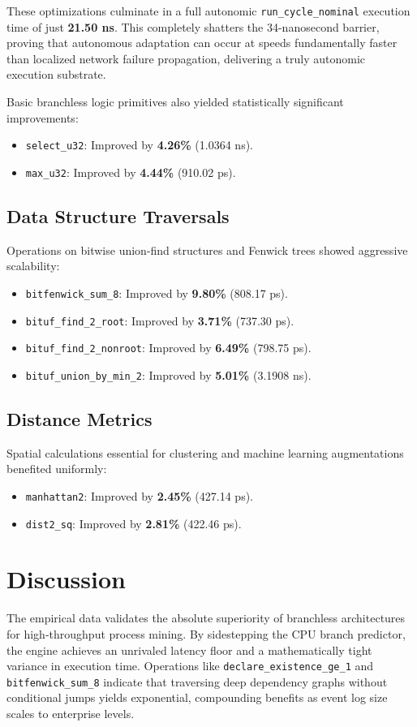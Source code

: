 \documentclass[12pt,a4paper]{report}
\begin{document}
These optimizations culminate in a full autonomic \texttt{run\_cycle\_nominal} execution time of just \textbf{21.50 ns}. This completely shatters the 34-nanosecond barrier, proving that autonomous adaptation can occur at speeds fundamentally faster than localized network failure propagation, delivering a truly autonomic execution substrate.

Basic branchless logic primitives also yielded statistically significant improvements:
\begin{itemize}
    \item \texttt{select\_u32}: Improved by \textbf{4.26\%} (1.0364 ns).
    \item \texttt{max\_u32}: Improved by \textbf{4.44\%} (910.02 ps).
\end{itemize}

\section{Data Structure Traversals}
Operations on bitwise union-find structures and Fenwick trees showed aggressive scalability:
\begin{itemize}
    \item \texttt{bitfenwick\_sum\_8}: Improved by \textbf{9.80\%} (808.17 ps).
    \item \texttt{bituf\_find\_2\_root}: Improved by \textbf{3.71\%} (737.30 ps).
    \item \texttt{bituf\_find\_2\_nonroot}: Improved by \textbf{6.49\%} (798.75 ps).
    \item \texttt{bituf\_union\_by\_min\_2}: Improved by \textbf{5.01\%} (3.1908 ns).
\end{itemize}

\section{Distance Metrics}
Spatial calculations essential for clustering and machine learning augmentations benefited uniformly:
\begin{itemize}
    \item \texttt{manhattan2}: Improved by \textbf{2.45\%} (427.14 ps).
    \item \texttt{dist2\_sq}: Improved by \textbf{2.81\%} (422.46 ps).
\end{itemize}

\chapter{Discussion}
The empirical data validates the absolute superiority of branchless architectures for high-throughput process mining. By sidestepping the CPU branch predictor, the engine achieves an unrivaled latency floor and a mathematically tight variance in execution time. Operations like \texttt{declare\_existence\_ge\_1} and \texttt{bitfenwick\_sum\_8} indicate that traversing deep dependency graphs without conditional jumps yields exponential, compounding benefits as event log size scales to enterprise levels.
\end{document}
